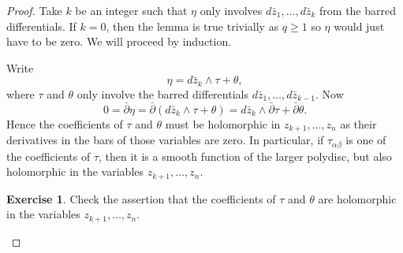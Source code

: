 \documentclass[12pt,openany]{book}
\theoremstyle{plain}
\theoremstyle{remark}
\theoremstyle{definition}
\newenvironment{exbox}{%
    \def\FrameCommand{\vrule width 1pt \relax\hspace{10pt}}%
    \MakeFramed{\advance\hsize-\width\FrameRestore}%
}{%
    \endMakeFramed
}
\theoremstyle{exercise}
\newtheorem{exercise}{Exercise}[section]
\theoremstyle{example}
\begin{document}
\begin{proof}
Take $k$ be an integer such that $\eta$ only involves
$d\bar{z}_1,\ldots,d\bar{z}_k$ from the barred differentials.
If $k=0$, then the lemma is true trivially as $q \geq 1$ so $\eta$ would
just have to be zero.
We will proceed by induction.

Write
\begin{equation*}
\eta = d\bar{z}_k \wedge \tau + \theta,
\end{equation*}
where $\tau$ and $\theta$ only involve the barred differentials
$d\bar{z}_1,\ldots,d\bar{z}_{k-1}$.
Now
\begin{equation*}
0 = \bar{\partial} \eta
= \bar{\partial} (d\bar{z}_k \wedge \tau + \theta)
= d\bar{z}_k \wedge \bar{\partial} \tau + \bar{\partial} \theta .
\end{equation*}
Hence the coefficients of $\tau$ and $\theta$ must be holomorphic in
$z_{k+1},\ldots,z_n$ as their derivatives in the bars of those variables
are zero.
In particular, if $\tau_{\alpha \beta}$ is one of the coefficients
of $\tau$, then it is a smooth function of the larger polydisc, but also
holomorphic in the variables $z_{k+1},\ldots,z_{n}$.

\begin{exbox}
\begin{exercise}
Check the assertion that the coefficients of
$\tau$ and $\theta$ are holomorphic in the variables $z_{k+1},\ldots,z_n$.
\end{exercise}
\end{exbox}



\end{proof}
\end{document}
